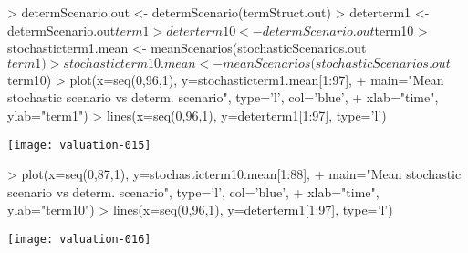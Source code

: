 \documentclass[12pt]{article}
\begin{document}
\begin{Schunk}
\begin{Sinput}
> determScenario.out <- determScenario(termStruct.out)
> deterterm1 <- determScenario.out$term1
> deterterm10 <- determScenario.out$term10
> stochasticterm1.mean <- meanScenarios(stochasticScenarios.out$term1)
> stochasticterm10.mean <- meanScenarios(stochasticScenarios.out$term10)
> plot(x=seq(0,96,1), y=stochasticterm1.mean[1:97],
+   main="Mean stochastic scenario vs determ. scenario", type='l', col='blue',
+   xlab="time", ylab="term1")
> lines(x=seq(0,96,1), y=deterterm1[1:97], type='l')
\end{Sinput}
\end{Schunk}
\texttt{[image: valuation-015]}

\begin{Schunk}
\begin{Sinput}
> plot(x=seq(0,87,1), y=stochasticterm10.mean[1:88], 
+   main="Mean stochastic scenario vs determ. scenario", type='l', col='blue',
+   xlab="time", ylab="term10")
> lines(x=seq(0,96,1), y=deterterm1[1:97], type='l')
\end{Sinput}
\end{Schunk}
\texttt{[image: valuation-016]}
\end{document}
